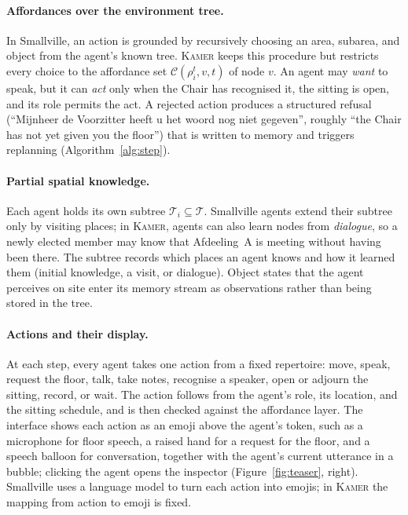 \documentclass[sigconf,review,anonymous]{acmart}
\newcommand{\sys}{\textsc{Kamer}}
\begin{document}
\paragraph{Affordances over the environment tree.} In Smallville, an action
is grounded by recursively choosing an area, subarea, and object from the
agent's known tree. \sys{} keeps this procedure but restricts every choice
to the affordance set $\mathcal{C}(\rho_i^t,v,t)$ of node $v$. An agent may
\emph{want} to speak, but it can \emph{act} only when the Chair has
recognised it, the sitting is open, and its role permits the act. A
rejected action produces a structured refusal (``Mijnheer de Voorzitter
heeft u het woord nog niet gegeven'', roughly ``the Chair has not yet given
you the floor'') that is written to memory and triggers replanning
(Algorithm~\ref{alg:step}).

\paragraph{Partial spatial knowledge.} Each agent holds its own subtree
$\mathcal{T}_i\subseteq\mathcal{T}$. Smallville agents extend their subtree
only by visiting places; in \sys{}, agents can also learn nodes from
\emph{dialogue}, so a newly elected member may know that Afdeeling~A is
meeting without having been there. The subtree records which places an
agent knows and how it learned them (initial knowledge, a visit, or
dialogue). Object states that the agent perceives on site enter its memory
stream as observations rather than being stored in the tree.

\paragraph{Actions and their display.} At each step, every agent takes one
action from a fixed repertoire: move, speak, request the floor, talk, take
notes, recognise a speaker, open or adjourn the sitting, record, or wait.
The action follows from the agent's role, its location, and the sitting
schedule, and is then checked against the affordance layer. The interface
shows each action as an emoji above the agent's token, such as a
microphone for floor speech, a raised hand for a request for the floor,
and a speech balloon for conversation, together with the agent's current
utterance in a bubble; clicking the agent opens the inspector
(Figure~\ref{fig:teaser}, right). Smallville uses a language model to
turn each action into emojis; in \sys{} the mapping from action to emoji
is fixed.
\end{document}
